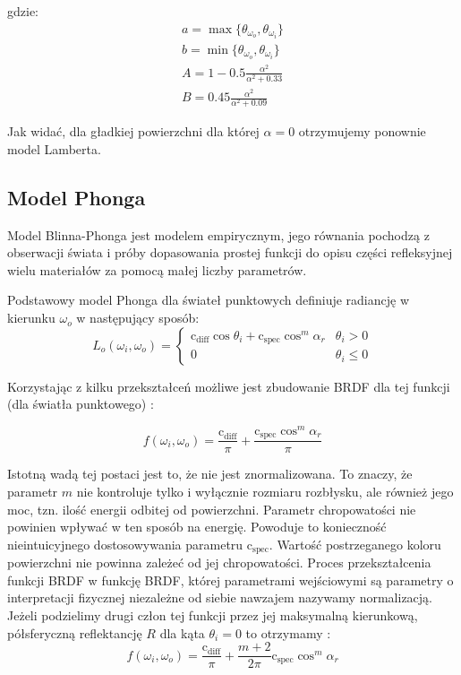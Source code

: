 \documentclass[../main.tex]{subfiles}
\newcommand{\cdiff}{\text{c}_{\text{diff}}}
\newcommand{\cspec}{\text{c}_{\text{spec}}}
\begin{document}

\noindent gdzie:
\begin{gather*}
  a = \max \{ \theta_{\omega_o}, \theta_{\omega_i} \} \\
  b = \min \{ \theta_{\omega_o}, \theta_{\omega_i} \} \\
  A = 1 - 0.5 \frac{\alpha^2}{\alpha^2 + 0.33} \\
  B = 0.45 \frac{\alpha^2}{\alpha^2 + 0.09}
\end{gather*}

Jak widać, dla gładkiej powierzchni dla której $\alpha=0$ otrzymujemy
ponownie model Lamberta.


\subsection{Model Phonga}

Model Blinna-Phonga jest modelem empirycznym, jego równania pochodzą z obserwacji świata i próby dopasowania prostej funkcji do opisu części refleksyjnej wielu materiałów za pomocą małej liczby parametrów.

Podstawowy model Phonga dla świateł punktowych definiuje radiancję w kierunku $\omega_o$ w następujący sposób:
\[
L_{o}(\omega_i, \omega_o) = \begin{cases}
\cdiff \cos\theta_i + \cspec \cos^{m}{\alpha_r} & \theta_i > 0 \\
0 & \theta_i \leq 0
\end{cases}
\]

Korzystając z kilku przekształceń możliwe jest zbudowanie BRDF dla tej funkcji (dla światła punktowego) \cite{RealTimeRendering2008}:

\[
f(\omega_i, \omega_o) = \frac{\cdiff}{\pi} + \frac{\cspec \cos^{m} \alpha_r}{\pi}
\]

Istotną wadą tej postaci jest to, że nie jest znormalizowana. To znaczy, że parametr $m$ nie kontroluje tylko i wyłącznie rozmiaru rozbłysku, ale również jego moc, tzn. ilość energii odbitej od powierzchni. Parametr chropowatości nie powinien wpływać w ten sposób na energię. Powoduje to konieczność nieintuicyjnego dostosowywania parametru $\cspec$. Wartość postrzeganego koloru powierzchni nie powinna zależeć od jej chropowatości. Proces przekształcenia funkcji BRDF w funkcję BRDF, której parametrami wejściowymi są parametry o interpretacji fizycznej niezależne od siebie nawzajem nazywamy normalizacją.  Jeżeli podzielimy drugi człon tej funkcji przez jej maksymalną kierunkową, półsferyczną reflektancję $R$ dla kąta $\theta_i = 0$ to otrzymamy \cite{RealTimeRendering2008}:
\[
  f(\omega_i, \omega_o) = \frac{\cdiff}{\pi} + \frac{m+2}{2\pi} {\cspec \cos^{m} \alpha_r}
\]
\end{document}

